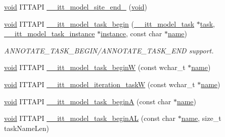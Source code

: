 \begin{DoxyCompactItemize}
\item 
\hyperlink{ittnotify__static_8h_af941d56e55e3c5465135b60c4d6343ed}{void} I\-T\-T\-A\-P\-I \hyperlink{group__model_ga427f7c1c6bfaf06cd6d895e066451bf9}{\-\_\-\-\_\-itt\-\_\-model\-\_\-site\-\_\-end\-\_} (\hyperlink{ittnotify__static_8h_af941d56e55e3c5465135b60c4d6343ed}{void})
\item 
\hyperlink{ittnotify__static_8h_af941d56e55e3c5465135b60c4d6343ed}{void} I\-T\-T\-A\-P\-I \hyperlink{group__model_ga5ed326c42962f58017287e207bda47c1}{\-\_\-\-\_\-itt\-\_\-model\-\_\-task\-\_\-begin} (\hyperlink{group__model_ga96b1dc87978dfc08d2f7740f9d3d2196}{\-\_\-\-\_\-itt\-\_\-model\-\_\-task} $\ast$\hyperlink{ittnotify__static_8h_aed9673d42c4239c5498e39aad80df904}{task}, \hyperlink{group__model_ga649e02ad732b5bfc895a239353d09588}{\-\_\-\-\_\-itt\-\_\-model\-\_\-task\-\_\-instance} $\ast$\hyperlink{ittnotify__static_8h_ab279bddbbeb45ffb20ea9886348683b1}{instance}, const char $\ast$\hyperlink{ittnotify__static_8h_a1c34b35a4952969fef60192313bba34a}{name})
\begin{DoxyCompactList}\small\item\em A\-N\-N\-O\-T\-A\-T\-E\-\_\-\-T\-A\-S\-K\-\_\-\-B\-E\-G\-I\-N/\-A\-N\-N\-O\-T\-A\-T\-E\-\_\-\-T\-A\-S\-K\-\_\-\-E\-N\-D support. \end{DoxyCompactList}\item 
\hyperlink{ittnotify__static_8h_af941d56e55e3c5465135b60c4d6343ed}{void} I\-T\-T\-A\-P\-I \hyperlink{group__model_gaf1d8632bde2bef71d4fc01a5b0ebd76f}{\-\_\-\-\_\-itt\-\_\-model\-\_\-task\-\_\-begin\-W} (const wchar\-\_\-t $\ast$\hyperlink{ittnotify__static_8h_a1c34b35a4952969fef60192313bba34a}{name})
\item 
\hyperlink{ittnotify__static_8h_af941d56e55e3c5465135b60c4d6343ed}{void} I\-T\-T\-A\-P\-I \hyperlink{group__model_gace3b1a76c4b0e2a3d3ef546c1ee1814e}{\-\_\-\-\_\-itt\-\_\-model\-\_\-iteration\-\_\-task\-W} (const wchar\-\_\-t $\ast$\hyperlink{ittnotify__static_8h_a1c34b35a4952969fef60192313bba34a}{name})
\item 
\hyperlink{ittnotify__static_8h_af941d56e55e3c5465135b60c4d6343ed}{void} I\-T\-T\-A\-P\-I \hyperlink{group__model_gad2ba1c00072ec87b59c66cf77c9bdcc3}{\-\_\-\-\_\-itt\-\_\-model\-\_\-task\-\_\-begin\-A} (const char $\ast$\hyperlink{ittnotify__static_8h_a1c34b35a4952969fef60192313bba34a}{name})
\item 
\hyperlink{ittnotify__static_8h_af941d56e55e3c5465135b60c4d6343ed}{void} I\-T\-T\-A\-P\-I \hyperlink{group__model_ga63fb5d6e81b9e9fc7632778fcd23dcc4}{\-\_\-\-\_\-itt\-\_\-model\-\_\-task\-\_\-begin\-A\-L} (const char $\ast$\hyperlink{ittnotify__static_8h_a1c34b35a4952969fef60192313bba34a}{name}, size\-\_\-t task\-Name\-Len)

\end{DoxyCompactItemize}
